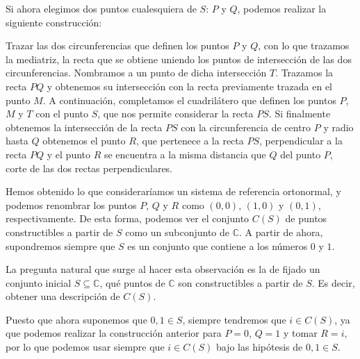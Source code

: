 \noindent
Si ahora elegimos dos puntos cualesquiera de $S$: $P$ y $Q$, podemos realizar la siguiente construcción:

\begin{figure}[H]
    \centering
\end{figure}

Trazar las dos circunferencias que definen los puntos $P$ y $Q$, con lo que trazamos la mediatriz, la recta que se obtiene uniendo los puntos de intersección de las dos circunferencias. Nombramos a un punto de dicha intersección $T$. Trazamos la recta $PQ$ y obtenemos su intersección con la recta previamente trazada en el punto $M$. A continuación, completamos el cuadrilátero que definen los puntos $P$, $M$ y $T$ con el punto $S$, que nos permite considerar la recta $PS$. Si finalmente obtenemos la intersección de la recta $PS$ con la circunferencia de centro $P$ y radio hasta $Q$ obtenemos el punto $R$, que pertenece a la recta $PS$, perpendicular a la recta $PQ$ y el punto $R$ se encuentra a la misma distancia que $Q$ del punto $P$, corte de las dos rectas perpendiculares.

Hemos obtenido lo que consideraríamos un sistema de referencia ortonormal, y podemos renombrar los puntos $P$, $Q$ y $R$ como $(0,0)$, $(1,0)$ y $(0,1)$, respectivamente. De esta forma, podemos ver el conjunto $C(S)$ de puntos constructibles a partir de $S$ como un subconjunto de $\mathbb{C}$. A partir de ahora, supondremos siempre que $S$ es un conjunto que contiene a los números $0$ y $1$.

La pregunta natural que surge al hacer esta observación es la de fijado un conjunto inicial $S\subseteq \mathbb{C}$, qué puntos de $\mathbb{C}$ son constructibles a partir de $S$. Es decir, obtener una descripción de $C(S)$.

\begin{observacion}
    Puesto que ahora suponemos que $0,1\in S$, siempre tendremos que $i \in C(S)$, ya que podemos realizar la construcción anterior para $P = 0$, $Q= 1$ y tomar $R = i$, por lo que podemos usar siempre que $i \in C(S)$ bajo las hipótesis de $0,1\in S$.
\end{observacion}

